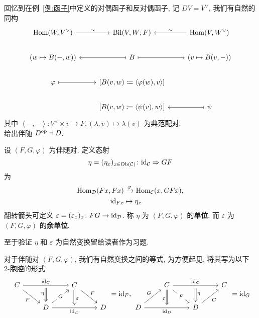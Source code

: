 \begin{example}[对偶-反对偶伴随]
    回忆到在例~\ref{例:函子}中定义的对偶函子和反对偶函子, 记 $DV = V^{\vee}$, 我们有自然的同构\cite[命题 8.1.5]{李文威线代}
    \[\begin{tikzcd}
	{\Hom(W,V^{\vee})} & {\op{Bil}(V,W;F)} & {\Hom(V,W^{\vee})} \\
	{\left(w \mapsto B(-,w)\right)} & B & {\left(v \mapsto B(v,-)\right)} \\
	\varphi & {[B(v,w) \coloneqq \left<\varphi(w),v\right>]} \\
	& {[B(v,w) \coloneqq \left<\psi(v),w\right>]} & \psi
	\arrow["\sim", from=1-1, to=1-2]
	\arrow["\sim"', from=1-3, to=1-2]
	\arrow[maps to, from=2-2, to=2-1]
	\arrow[maps to, from=2-2, to=2-3]
	\arrow[maps to, from=3-1, to=3-2]
	\arrow[maps to, from=4-3, to=4-2]
    \end{tikzcd}\]
    其中 $\left<-,-\right>\colon V^{\vee} \times v\to F,(\lambda, v) \mapsto \lambda(v)$ 为典范配对.\\
    给出伴随 $D^{\operatorname{op}} \dashv D$.
\end{example}
\begin{definition}[单位和余单位]
    设 $(F,G,\varphi)$ 为伴随对, 定义态射
    \[
    \eta = (\eta_x)_{x\in \operatorname{Ob}(\cal{C})} \colon \mathrm{id}_{\cal{C}} \Rightarrow GF
    \]
    为
    \begin{align*}
        \operatorname{Hom}_{\cal{D}}(Fx,Fx) &\xrightarrow{\varphi}\operatorname{Hom}_{\cal{C}}(x,GFx),\\
        \mathrm{id}_{Fx} &\mapsto \eta_x
    \end{align*}
    翻转箭头可定义 $\varepsilon = (\varepsilon_x)_{x} \colon FG \to \mathrm{id}_{\cal{D}}$. 称 $\eta$ 为 $(F,G,\varphi)$ 的\textbf{单位}, 而 $\varepsilon$ 为 $(F,G,\varphi)$ 的\textbf{余单位}.
\end{definition}
至于验证 $\eta$ 和 $\varepsilon$ 为自然变换留给读者作为习题.
\begin{lemma}[三角等式]
    对于伴随对 $(F,G,\varphi)$, 我们有自然变换之间的等式, 为方便起见, 将其写为以下 2-胞腔的形式
    \[\begin{tikzcd}
	C && C \\
	& D && D
	\arrow[""{name=0, anchor=center, inner sep=0}, "{\identity_{C}}", from=1-1, to=1-3]
	\arrow["F"', from=1-1, to=2-2]
	\arrow["F", from=1-3, to=2-4]
	\arrow["G"{description}, from=2-2, to=1-3]
	\arrow[""{name=1, anchor=center, inner sep=0}, "{\identity_D}"', from=2-2, to=2-4]
	\arrow["\eta"', shorten <=3pt, Rightarrow, from=0, to=2-2]
	\arrow["\varepsilon", shorten >=3pt, Rightarrow, from=1-3, to=1]
\end{tikzcd}= \identity_F,\begin{tikzcd}
	& C && C \\
	D && D
	\arrow[""{name=0, anchor=center, inner sep=0}, "{\identity_C}", from=1-2, to=1-4]
	\arrow["F"{description}, from=1-2, to=2-3]
	\arrow["G", from=2-1, to=1-2]
	\arrow[""{name=1, anchor=center, inner sep=0}, "{\identity_D}"', from=2-1, to=2-3]
	\arrow["G"', from=2-3, to=1-4]
	\arrow["\varepsilon"', shorten >=3pt, Rightarrow, from=1-2, to=1]
	\arrow["\eta", shorten <=3pt, Rightarrow, from=0, to=2-3]
\end{tikzcd}=\identity_G\]
\end{lemma}
